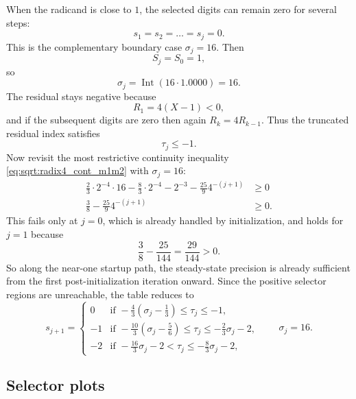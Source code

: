 \documentclass[11pt]{article}
\DeclareMathOperator{\Int}{Int}
\numberwithin{equation}{section}
\begin{document}
When the radicand is close to $1$, the selected digits can remain zero for several steps:
\[
  s_1 = s_2 = \dotsc = s_j = 0.
\]
This is the complementary boundary case $\sigma_j=16$.
Then
\begin{equation}
  \label{eq:sqrt:radix4_near_one_sj}
  S_j = S_0 = 1,
\end{equation}
so
\begin{equation}
  \label{eq:sqrt:radix4_near_one_sigma}
  \sigma_j = \Int(16\cdot 1.0000) = 16.
\end{equation}
The residual stays negative because
\begin{equation}
  \label{eq:sqrt:radix4_near_one_r1}
  R_1 = 4(X-1) < 0,
\end{equation}
and if the subsequent digits are zero then again $R_k = 4R_{k-1}$.
Thus the truncated residual index satisfies
\begin{equation}
  \label{eq:sqrt:radix4_near_one_tau}
  \tau_j \le -1.
\end{equation}
Now revisit the most restrictive continuity inequality
\cref{eq:sqrt:radix4_cont_m1m2} with $\sigma_j=16$:
\begin{align}
  \frac{2}{3}\cdot 2^{-4}\cdot 16 - \frac{8}{3}\cdot 2^{-4} - 2^{-3} - \frac{25}{9}4^{-(j+1)} &\ge 0 \nonumber \\
  \frac{3}{8} - \frac{25}{9}4^{-(j+1)} &\ge 0.
  \label{eq:sqrt:radix4_near_one_continuity}
\end{align}
This fails only at $j=0$, which is already handled by initialization, and holds for $j=1$ because
\[
  \frac{3}{8} - \frac{25}{144} = \frac{29}{144} > 0.
\]
So along the near-one startup path, the steady-state precision is already sufficient from the first
post-initialization iteration onward.
Since the positive selector regions are unreachable, the table reduces to
\begin{equation}
  \label{eq:sqrt:radix4_logic_near_one}
  s_{j+1} =
  \begin{cases}
    0  & \text{if } -\frac{4}{3}\left(\sigma_j-\frac{1}{3}\right) \le \tau_j \le -1, \\
    -1 & \text{if } -\frac{10}{3}\left(\sigma_j-\frac{5}{6}\right) \le \tau_j \le -\frac{2}{3}\sigma_j - 2, \\
    -2 & \text{if } -\frac{16}{3}\sigma_j - 2 < \tau_j \le -\frac{8}{3}\sigma_j - 2,
  \end{cases}
  \qquad \sigma_j = 16.
\end{equation}

\subsection{Selector plots}
\label{ssec:sqrt:figures}
\end{document}
